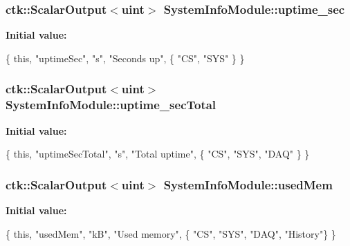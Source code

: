 \subsubsection[{\texorpdfstring{uptime\+\_\+sec}{uptime_sec}}]{\setlength{\rightskip}{0pt plus 5cm}ctk\+::\+Scalar\+Output$<$uint$>$ System\+Info\+Module\+::uptime\+\_\+sec}\hypertarget{classSystemInfoModule_a37531abc205aa56fb9902be3f37a7ddc}{}\label{classSystemInfoModule_a37531abc205aa56fb9902be3f37a7ddc}
{\bfseries Initial value\+:}
\begin{DoxyCode}
\{ \textcolor{keyword}{this}, \textcolor{stringliteral}{"uptimeSec"}, \textcolor{stringliteral}{"s"}, \textcolor{stringliteral}{"Seconds up"},
    \{ \textcolor{stringliteral}{"CS"}, \textcolor{stringliteral}{"SYS"} \} \}
\end{DoxyCode}
\subsubsection[{\texorpdfstring{uptime\+\_\+sec\+Total}{uptime_secTotal}}]{\setlength{\rightskip}{0pt plus 5cm}ctk\+::\+Scalar\+Output$<$uint$>$ System\+Info\+Module\+::uptime\+\_\+sec\+Total}\hypertarget{classSystemInfoModule_a24aae972a9dcacbabea194d65067ad0a}{}\label{classSystemInfoModule_a24aae972a9dcacbabea194d65067ad0a}
{\bfseries Initial value\+:}
\begin{DoxyCode}
\{ \textcolor{keyword}{this}, \textcolor{stringliteral}{"uptimeSecTotal"}, \textcolor{stringliteral}{"s"}, \textcolor{stringliteral}{"Total uptime"},
      \{ \textcolor{stringliteral}{"CS"}, \textcolor{stringliteral}{"SYS"}, \textcolor{stringliteral}{"DAQ"} \} \}
\end{DoxyCode}
\subsubsection[{\texorpdfstring{used\+Mem}{usedMem}}]{\setlength{\rightskip}{0pt plus 5cm}ctk\+::\+Scalar\+Output$<$uint$>$ System\+Info\+Module\+::used\+Mem}\hypertarget{classSystemInfoModule_ad64ffc997fdf19f4693524894ba4e54a}{}\label{classSystemInfoModule_ad64ffc997fdf19f4693524894ba4e54a}
{\bfseries Initial value\+:}
\begin{DoxyCode}
\{ \textcolor{keyword}{this}, \textcolor{stringliteral}{"usedMem"}, \textcolor{stringliteral}{"kB"}, \textcolor{stringliteral}{"Used memory"},
    \{ \textcolor{stringliteral}{"CS"}, \textcolor{stringliteral}{"SYS"}, \textcolor{stringliteral}{"DAQ"}, \textcolor{stringliteral}{"History"}\} \}
\end{DoxyCode}

